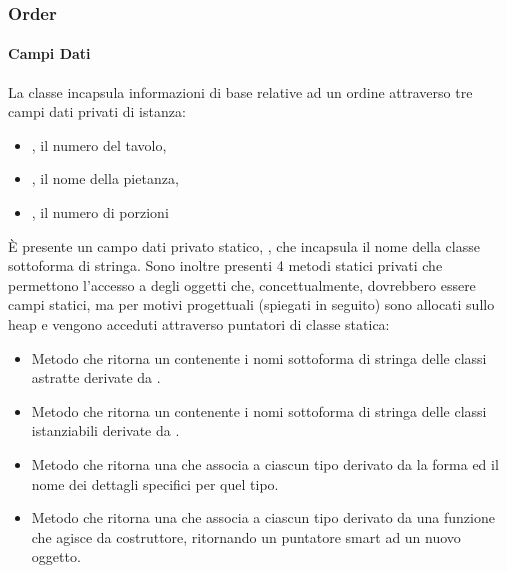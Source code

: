 \subsubsection{Order} %
\label{ssub:order}
\paragraph{Campi Dati} %
\label{par:campi_dati}
La classe  incapsula informazioni di base relative ad un ordine attraverso tre campi dati privati di istanza:
\begin{itemize}
	\item {}, il numero del tavolo,
	\item {}, il nome della pietanza,
	\item {}, il numero di porzioni
\end{itemize}
È presente un campo dati privato statico, , che incapsula il nome della classe sottoforma di stringa. Sono inoltre presenti 4 metodi statici privati che permettono l'accesso a degli oggetti che, concettualmente, dovrebbero essere campi statici, ma per motivi progettuali (spiegati in seguito) sono allocati sullo heap e vengono acceduti attraverso puntatori di classe statica:
\begin{itemize}
	\item {}\newline
	Metodo che ritorna un  contenente i nomi sottoforma di stringa delle classi astratte derivate da .
	\item {}\newline
	Metodo che ritorna un  contenente i nomi sottoforma di stringa delle classi istanziabili derivate da .
	\item {}\newline
	Metodo che ritorna una  che associa a ciascun tipo derivato da  la forma ed il nome dei dettagli specifici per quel tipo.
	\item {}\newline
	\newline
	Metodo che ritorna una  che associa a ciascun tipo derivato da  una funzione che agisce da costruttore, ritornando un puntatore smart ad un nuovo oggetto.
\end{itemize}

